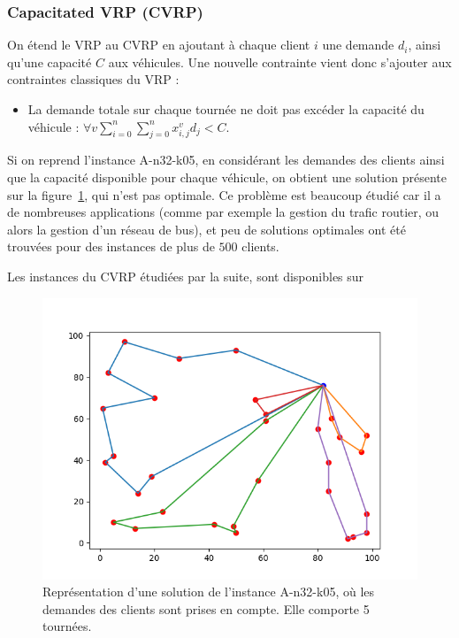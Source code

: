 \documentclass[a4paper,11pt]{article}%
\begin{document}
\subsubsection{Capacitated VRP (CVRP)}

On étend le VRP au CVRP en ajoutant à chaque client $i$ une demande $d_i$, ainsi qu'une capacité $C$ aux véhicules.
Une nouvelle contrainte vient donc s'ajouter aux contraintes classiques du VRP :

\begin{itemize}
\item La demande totale sur chaque tournée ne doit pas excéder la capacité du véhicule : $\forall v \sum_{i = 0}^{n} \sum_{j = 0}^{n} x_{i,j}^v d_j < C$.
\end{itemize}

Si on reprend l'instance A-n32-k05, en considérant les demandes des clients ainsi que la capacité disponible pour chaque véhicule, on obtient une solution présente sur la figure~\ref{SC3205}, qui n'est pas optimale. 
Ce problème est beaucoup étudié car il a de nombreuses applications (comme par exemple la gestion du trafic routier, ou alors la gestion d'un réseau de bus), et peu de solutions optimales ont été trouvées pour des instances de plus de $500$ clients. 

Les instances du CVRP étudiées par la suite, sont disponibles sur~\cite{cvrplib} 

\begin{figure}
\centering
\includegraphics[scale=0.5]{solutionCapacity.png}
\caption{Représentation d'une solution de l'instance A-n32-k05, où les demandes des clients sont prises en compte. Elle comporte 5 tournées.}
\label{SC3205}
\end{figure}
\end{document}
